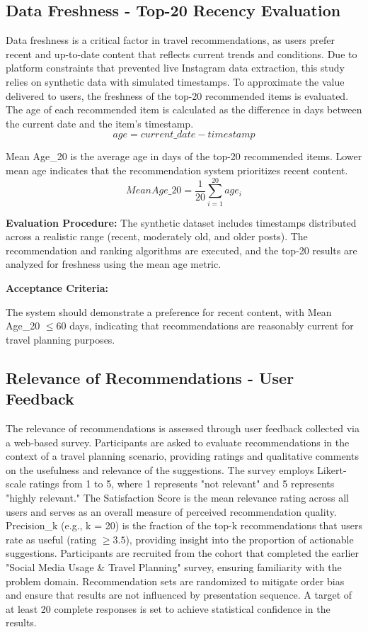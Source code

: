 \documentclass[a4paper,12pt]{report}
\begin{document}
\subsection{Data Freshness - Top-20 Recency Evaluation}
Data freshness is a critical factor in travel recommendations, as users prefer recent and up-to-date content that reflects current trends and conditions. Due to platform constraints that prevented live Instagram data extraction, this study relies on synthetic data with simulated timestamps. To approximate the value delivered to users, the freshness of the top-20 recommended items is evaluated.
The age of each recommended item is calculated as the difference in days between the current date and the item's timestamp.
\begin{equation}
age = current\_date - timestamp
\end{equation}

Mean Age\_20 is the average age in days of the top-20 recommended items. Lower mean age indicates that the recommendation system prioritizes recent content.
\begin{equation}
MeanAge\_20 = \frac{1}{20} \sum_{i=1}^{20} age_i
\end{equation}

\textbf{Evaluation Procedure:} The synthetic dataset includes timestamps distributed across a realistic range (recent, moderately old, and older posts). The recommendation and ranking algorithms are executed, and the top-20 results are analyzed for freshness using the mean age metric.

\textbf{Acceptance Criteria:}

The system should demonstrate a preference for recent content, with Mean Age\_20 $\le 60$ days, indicating that recommendations are reasonably current for travel planning purposes.

\subsection{Relevance of Recommendations - User Feedback}
The relevance of recommendations is assessed through user feedback collected via a web-based survey. Participants are asked to evaluate recommendations in the context of a travel planning scenario, providing ratings and qualitative comments on the usefulness and relevance of the suggestions.
The survey employs Likert-scale ratings from 1 to 5, where 1 represents "not relevant" and 5 represents "highly relevant." The Satisfaction Score is the mean relevance rating across all users and serves as an overall measure of perceived recommendation quality. Precision\_k (e.g., k = 20) is the fraction of the top-k recommendations that users rate as useful (rating $\ge 3.5$), providing insight into the proportion of actionable suggestions.
Participants are recruited from the cohort that completed the earlier "Social Media Usage \& Travel Planning" survey, ensuring familiarity with the problem domain. Recommendation sets are randomized to mitigate order bias and ensure that results are not influenced by presentation sequence. A target of at least 20 complete responses is set to achieve statistical confidence in the results.
\end{document}
